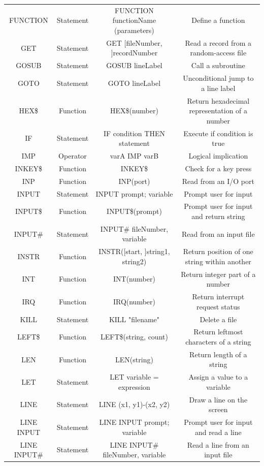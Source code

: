 \documentclass[10pt, reqno]{exam}
\begin{document}
{\begin{longtable}{|c|c|c|c|}
    FUNCTION & Statement & FUNCTION functionName (parameters) & Define a function \\
    GET & Statement & GET [fileNumber, ]recordNumber & Read a record from a random-access file \\
    GOSUB & Statement & GOSUB lineLabel & Call a subroutine \\
    GOTO & Statement & GOTO lineLabel & Unconditional jump to a line label \\
    HEX\$ & Function & HEX\$(number) & Return hexadecimal representation of a number \\
    IF & Statement & IF condition THEN statement & Execute if condition is true \\
    IMP & Operator & varA IMP varB & Logical implication \\
    INKEY\$ & Function & INKEY\$ & Check for a key press \\
    INP & Function & INP(port) & Read from an I/O port \\
    INPUT & Statement & INPUT prompt; variable & Prompt user for input \\
    INPUT\$ & Function & INPUT\$(prompt) & Prompt user for input and return string \\
    INPUT\# & Statement & INPUT\# fileNumber, variable & Read from an input file \\
    INSTR & Function & INSTR([start, ]string1, string2) & Return position of one string within another \\
    INT & Function & INT(number) & Return integer part of a number \\
    IRQ & Function & IRQ(number) & Return interrupt request status \\
    KILL & Statement & KILL "filename" & Delete a file \\
    LEFT\$ & Function & LEFT\$(string, count) & Return leftmost characters of a string \\
    LEN & Function & LEN(string) & Return length of a string \\
    LET & Statement & LET variable = expression & Assign a value to a variable \\
    LINE & Statement & LINE (x1, y1)-(x2, y2) & Draw a line on the screen \\
    LINE INPUT & Statement & LINE INPUT prompt; variable & Prompt user for input and read a line \\
    LINE INPUT\# & Statement & LINE INPUT\# fileNumber, variable & Read a line from an input file \\

\end{longtable}}
\end{document}
